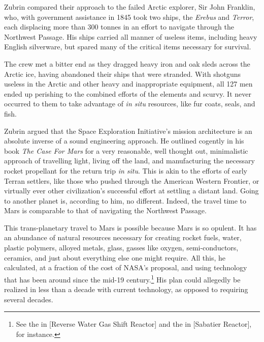 Zubrin compared their approach to the failed Arctic explorer, Sir John Franklin, who, with government assistance in 1845 took two ships, the {\it Erebus} and {\it Terror}, each displacing more than 300 tonnes in an effort to navigate through the Northwest Passage. His ships carried all manner of useless items, including heavy English silverware, but spared many of the critical items necessary for survival. 

The crew met a bitter end as they dragged heavy iron and oak sleds across the Arctic ice, having abandoned their ships that were stranded. With shotguns useless in the Arctic and other heavy and inappropriate equipment, all 127 men ended up perishing to the combined efforts of the elements and scurvy. It never occurred to them to take advantage of {\it in situ} resources, like fur coats, seals, and fish.

Zubrin argued that the Space Exploration Initiative's mission architecture is an absolute inverse of a sound engineering approach. He outlined cogently in his book {\it The Case For Mars} for a very reasonable, well thought out, minimalistic approach of travelling light, living off the land, and manufacturing the necessary rocket propellant for the return trip {\it in situ}. This is akin to the efforts of early Terran settlers, like those who pushed through the American Western Frontier, or virtually ever other civilization's successful effort at settling a distant land. Going to another planet is, according to him, no different. Indeed, the travel time to Mars is comparable to that of navigating the Northwest Passage.

This trans-planetary travel to Mars is possible because Mars is so opulent. It has an abundance of natural resources necessary for creating rocket fuels, water, plastic polymers, alloyed metals, glass, gasses like oxygen, semi-conductors, ceramics, and just about everything else one might require. All this, he calculated, at a fraction of the cost of NASA's proposal, and using technology that has been around since the mid-19 century.\footnote{See the  in [Reverse Water Gas Shift Reactor] and the  in [Sabatier Reactor], for instance.} His plan could allegedly be realized in less than a decade with current technology, as opposed to requiring several decades.


